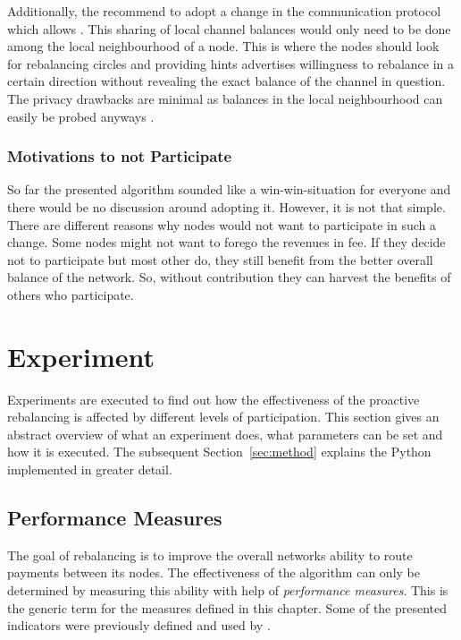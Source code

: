 \documentclass[final]{fhnwreport}       %
\begin{document}
Additionally, the recommend to adopt a change in the communication protocol which allows . This sharing of local channel balances would only need to be done among the local neighbourhood of a node. This is where the nodes should look for rebalancing circles and providing hints advertises willingness to rebalance in a certain direction without revealing the exact balance of the channel in question. The privacy drawbacks are minimal as balances in the local neighbourhood can easily be probed anyways \citep{tikhomirov_probing_2020}. 
 
\subsubsection{Motivations to not Participate}
So far the presented algorithm sounded like a win-win-situation for everyone and there would be no discussion around adopting it. However, it is not that simple. There are different reasons why nodes would not want to participate in such a change. Some nodes might not want to forego the revenues in fee. If they decide not to participate but most other do, they still benefit from the better overall balance of the network. So, without contribution they can harvest the benefits of others who participate. 

\newpage
\section{Experiment}\label{sec:experiment}
Experiments are executed to find out how the effectiveness of the proactive rebalancing is affected by different levels of participation. This section gives an abstract overview of what an experiment does, what parameters can be set and how it is executed. The subsequent Section~\ref{sec:method} explains the Python implemented in greater detail.

\subsection{Performance Measures}\label{sub:perfm}
The goal of rebalancing is to improve the overall networks ability to route payments between its nodes. The effectiveness of the algorithm can only be determined by measuring this ability with help of \emph{performance measures}. This is the generic term for the measures defined in this chapter. Some of the presented indicators were previously defined and used by \textcite{pickhardt_evaluating_2020}. 
\end{document}
